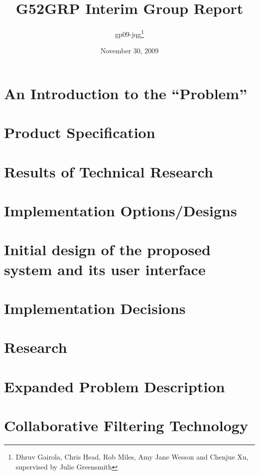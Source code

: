 \documentclass[12pt]{article}
\title{G52GRP Interim Group Report}                     %
\author{gp09-jqg\thanks{Dhruv Gairola, Chris Head, Rob Miles, Amy Jane Wesson and Chenjue Xu, supervised by Julie Greensmith}} %
\date{November 30, 2009}                                    %
\begin{document}
\maketitle                                              %

\tableofcontents
\newpage

\section{An Introduction to the ``Problem''}

\newpage

\section{Product Specification} 			%
\label{sec:productspec}

\newpage


\section{Results of Technical Research}		%

\newpage

\section{Implementation Options/Designs}

\newpage

\section{Initial design of the proposed system and its user interface}

\newpage

\section{Implementation Decisions}

\newpage

\section{Research} %

\newpage

\section{Expanded Problem Description}

\newpage

\section{Collaborative Filtering Technology}

\newpage
\end{document}
